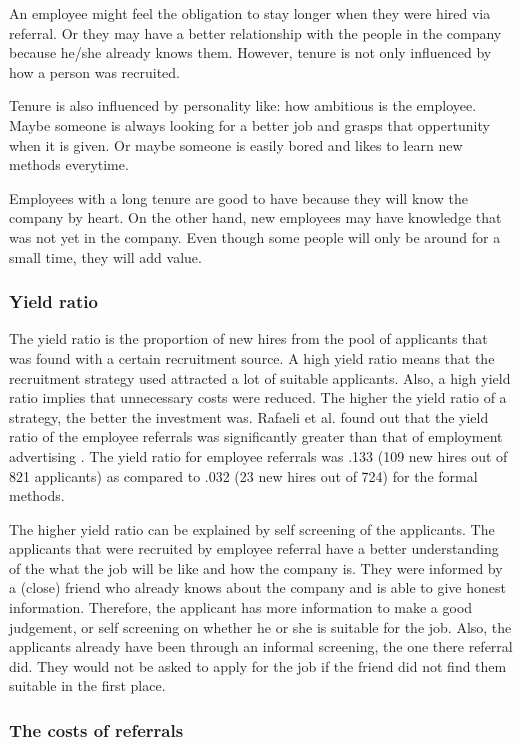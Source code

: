 \documentclass[Main.tex]{subfiles}
\begin{document}
An employee might feel the obligation to stay longer when they were hired via referral. Or they may have a better relationship with the people in the company because he/she already knows them. However, tenure is not only influenced by how a person was recruited. 

Tenure is also influenced by personality like: how ambitious is the employee. Maybe someone is always looking for a better job and grasps that oppertunity when it is given. Or maybe someone is easily bored and likes to learn new methods everytime.

Employees with a long tenure are good to have because they will know the company by heart. On the other hand, new employees may have knowledge that was not yet in the company. Even though some people will only be around for a small time, they will add value. 

\subsubsection*{Yield ratio}
The yield ratio is the proportion of new hires from the pool of applicants that was found with a certain recruitment source. A high yield ratio means that the recruitment strategy used attracted a lot of suitable applicants. Also, a high yield ratio implies that unnecessary costs were reduced. The higher the yield ratio of a strategy, the better the investment was. 
Rafaeli et al. found out that the yield ratio of the employee referrals was significantly greater than that of employment advertising \cite{fourth}. The yield ratio for employee referrals was .133 (109 new
hires out of 821 applicants) as compared to .032 (23 new hires out of 724) for the formal methods. 

The higher yield ratio can be explained by self screening of the applicants. The applicants that were recruited by employee referral have a better understanding of the what the job will be like and how the company is. They were informed by a (close) friend who already knows about the company and is able to give honest information. Therefore, the applicant has more information to make a good judgement, or self screening on whether he or she is suitable for the job. Also, the applicants already have been through an informal screening, the one there referral did. They would not be asked to apply for the job if the friend did not find them suitable in the first place. 

\subsubsection*{The costs of referrals}
\end{document}
